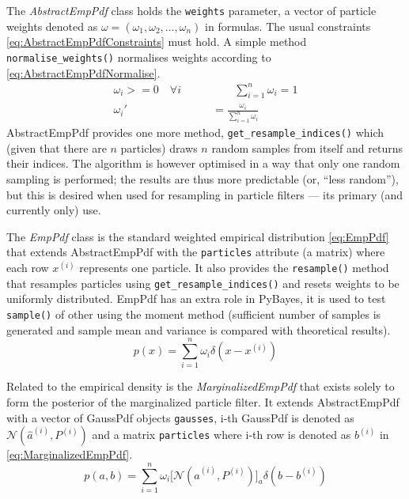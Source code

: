 The \emph{AbstractEmpPdf} class holds the \verb|weights| parameter, a vector of particle weights denoted as
\(\omega = (\omega_1, \omega_2, \dotsc, \omega_n)\) in formulas. The usual constraints
\eqref{eq:AbstractEmpPdfConstraints} must hold. A simple method \verb|normalise_weights()| normalises
weights according to \eqref{eq:AbstractEmpPdfNormalise}.
\begin{align}
	\omega_i >= 0 \quad \forall i \quad \quad & \quad \quad \sum_{i=1}^n \omega_i = 1 \label{eq:AbstractEmpPdfConstraints} \\
	\omega_i' &= \frac{\omega_i}{\sum_{i=1}^n \omega_i} \label{eq:AbstractEmpPdfNormalise}
\end{align}
AbstractEmpPdf provides one more method, \verb|get_resample_indices()| which
(given that there are \(n\) particles) draws \(n\) random samples from itself and returns their
indices. The algorithm is however optimised in a way that only one random sampling is performed; the
results are thus more predictable (or, ``less random''), but this is desired when used for resampling
in particle filters --- its primary (and currently only) use.

The \emph{EmpPdf} class is the standard weighted empirical distribution \eqref{eq:EmpPdf} that extends
AbstractEmpPdf with the \verb|particles| attribute (a matrix) where each row \(x^{(i)}\) represents
one particle. It also provides the \verb|resample()| method that resamples particles using
\verb|get_resample_indices()| and resets weights to be uniformly distributed. EmpPdf has an extra
role in PyBayes, it is used to test \verb|sample()| of other {\pdfs} using the moment method
(sufficient number of samples is generated and sample mean and variance is compared with theoretical
results).
\begin{equation} \label{eq:EmpPdf}
	p(x) = \sum_{i=1}^n \omega_i \delta(x - x^{(i)})
\end{equation}

Related to the empirical density is the \emph{MarginalizedEmpPdf} that exists solely to form the
posterior {\pdf} of the marginalized particle filter. It extends AbstractEmpPdf with a vector of
GaussPdf objects \verb|gausses|, i-th GaussPdf is denoted as \(\mathcal{N}\left(\hat{a}^{(i)},
P^{(i)}\right)\) and a matrix \verb|particles| where i-th row is denoted as \(b^{(i)}\) in
\eqref{eq:MarginalizedEmpPdf}.
\begin{equation} \label{eq:MarginalizedEmpPdf}
	p(a, b) = \sum_{i=1}^n \omega_i \Big[ \mathcal{N}\left(\hat{a}^{(i)}, P^{(i)}\right) \Big]_a
		\delta(b - b^{(i)})
\end{equation}

